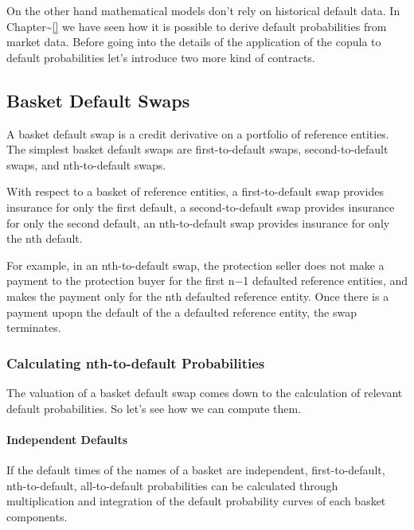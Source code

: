 \documentclass[11pt]{article}
\begin{document}
On the other hand mathematical models don't rely on historical default
data. In Chapter\textasciitilde{}\ref{} we have seen how it is possible
to derive default probabilities from market data. Before going into the
details of the application of the copula to default probabilities let's
introduce two more kind of contracts.

\hypertarget{basket-default-swaps}{%
\subsection{Basket Default Swaps}\label{basket-default-swaps}}

A basket default swap is a credit derivative on a portfolio of reference
entities. The simplest basket default swaps are first-to-default swaps,
second-to-default swaps, and nth-to-default swaps.

With respect to a basket of reference entities, a first-to-default swap
provides insurance for only the first default, a second-to-default swap
provides insurance for only the second default, an nth-to-default swap
provides insurance for only the nth default.

For example, in an nth-to-default swap, the protection seller does not
make a payment to the protection buyer for the first n−1 defaulted
reference entities, and makes the payment only for the nth defaulted
reference entity. Once there is a payment upopn the default of the a
defaulted reference entity, the swap terminates.

\hypertarget{calculating-nth-to-default-probabilities}{%
\subsubsection{Calculating nth-to-default
Probabilities}\label{calculating-nth-to-default-probabilities}}

The valuation of a basket default swap comes down to the calculation of
relevant default probabilities. So let's see how we can compute them.

\hypertarget{independent-defaults}{%
\paragraph{Independent Defaults}\label{independent-defaults}}

If the default times of the names of a basket are independent,
first-to-default, nth-to-default, all-to-default probabilities can be
calculated through multiplication and integration of the default
probability curves of each basket components.
\end{document}

